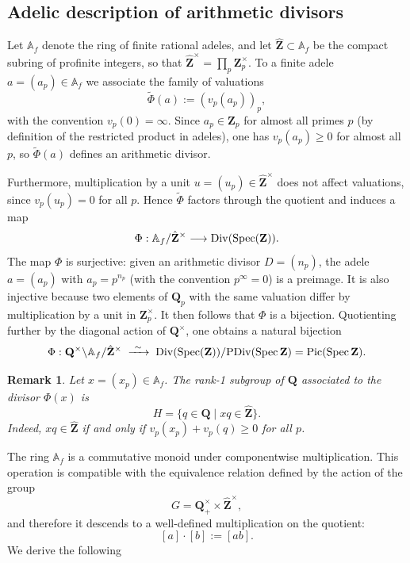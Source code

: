 \documentclass[11pt,a4paper]{article}
\newcommand{\Q}{\mathbf{Q}}
\newcommand{\Z}{\mathbf{Z}}
\newcommand{\A}{\mathbb{A}}
\def\spz{\Spec \Z}
\newcommand{\Spec}{\operatorname{Spec}}
\def\Pic{\operatorname{Pic}}
\def\Div{{\rm Div}}
\def\PDiv{{\rm PDiv}}
\def\spz{\Spec \Z}
\theoremstyle{plain}
\newtheorem{rem}[thm]{Remark}
\theoremstyle{definition} %
\begin{document}
\subsection{Adelic description of arithmetic divisors}

Let $\A_f$ denote the ring of finite rational adeles, and let
$\widehat{\Z}\subset \A_f$ be the compact subring of profinite integers,
so that $\widehat{\Z}^\times=\prod_p \Z_p^\times$.
To a finite adele $a=(a_p)\in\A_f$ we associate the family of valuations
\[
\tilde\Phi(a):=(v_p(a_p))_{p},
\]
with the convention $v_p(0)=\infty$.
Since $a_p\in\Z_p$ for almost all primes $p$ (by definition of the restricted product in adeles), one has $v_p(a_p)\ge 0$
for almost all $p$, so $\tilde\Phi(a)$ defines an arithmetic divisor.

Furthermore, multiplication by a unit $u=(u_p)\in\widehat{\Z}^\times$ does not affect
valuations, since $v_p(u_p)=0$ for all $p$.
Hence $\tilde\Phi$ factors through the quotient and induces a map
\begin{equation}\label{fifi}
\Phi:\A_f/\hat{\Z}^\times \longrightarrow \Div(\Spec(\Z)).
\end{equation}
The map $\Phi$ is surjective: given an arithmetic divisor
$D=(n_p)$, the adele $a=(a_p)$ with $a_p=p^{n_p}$ (with the convention
$p^\infty=0$) is a preimage.
It is also injective because two elements of $\Q_p$ with the same valuation
differ by multiplication by a unit in $\Z_p^\times$. It then follows that $\Phi$ is a bijection.
Quotienting further by the diagonal action of $\Q^\times$, one obtains
a natural bijection
\begin{equation}\label{fifi1}
\Phi:\Q^\times\backslash\A_f/\hat{\Z}^\times
\;\xrightarrow{\ \sim\ }\;
\Div(\Spec(\Z))/\PDiv(\spz)
=\Pic(\spz).
\end{equation}

\begin{rem}\label{ade}
Let $x=(x_p)\in\A_f$.
The rank-1 subgroup of $\Q$ associated to the divisor $\Phi(x)$ is
\[
H=\{q\in\Q \mid xq\in\widehat{\Z}\}.
\]
Indeed, $xq\in\widehat{\Z}$ if and only if $v_p(x_p)+v_p(q)\ge 0$ for all $p$.
\end{rem}

The ring $\A_f$ is a commutative monoid under componentwise multiplication.
This operation is compatible with the equivalence relation defined by the
action of the group
\[
G=\Q_+^\times\times\widehat{\Z}^\times,
\]
and therefore it descends to a well-defined multiplication on the quotient:
\[
[a]\cdot[b]:=[ab].
\]
We derive the following
\end{document}
